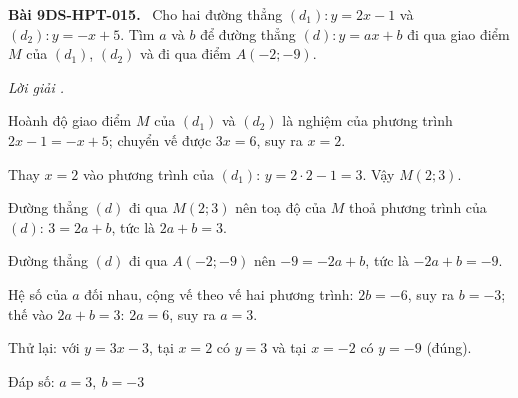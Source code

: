 \documentclass[12pt,a4paper]{article}
\newenvironment{problem}[1][]{\par\medskip\noindent\textbf{Bài #1.}\ }{\par}
\newenvironment{solution}[1][]{\par\noindent\textit{Lời giải #1.}\par}{\par}
\begin{document}
\begin{problem}[9DS-HPT-015]
Cho hai đường thẳng $(d_1)\colon y = 2x - 1$ và $(d_2)\colon y = -x + 5$. Tìm $a$ và $b$ để đường thẳng $(d)\colon y = ax + b$ đi qua giao điểm $M$ của $(d_1)$, $(d_2)$ và đi qua điểm $A(-2; -9)$.

\begin{solution}
Hoành độ giao điểm $M$ của $(d_1)$ và $(d_2)$ là nghiệm của phương trình $2x - 1 = -x + 5$; chuyển vế được $3x = 6$, suy ra $x = 2$.

Thay $x = 2$ vào phương trình của $(d_1)$: $y = 2 \cdot 2 - 1 = 3$. Vậy $M(2; 3)$.

Đường thẳng $(d)$ đi qua $M(2; 3)$ nên toạ độ của $M$ thoả phương trình của $(d)$: $3 = 2a + b$, tức là $2a + b = 3$.

Đường thẳng $(d)$ đi qua $A(-2; -9)$ nên $-9 = -2a + b$, tức là $-2a + b = -9$.

Hệ số của $a$ đối nhau, cộng vế theo vế hai phương trình: $2b = -6$, suy ra $b = -3$; thế vào $2a + b = 3$: $2a = 6$, suy ra $a = 3$.

Thử lại: với $y = 3x - 3$, tại $x = 2$ có $y = 3$ và tại $x = -2$ có $y = -9$ (đúng).

Đáp số: $\boxed{a = 3,\ b = -3}$
\end{solution}
\end{problem}
\end{document}
